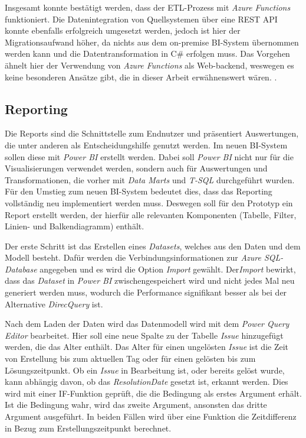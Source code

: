 Insgesamt konnte bestätigt werden, dass der ETL-Prozess mit \textit{Azure Functions} funktioniert. Die Datenintegration von Quellsystemen über eine REST API konnte ebenfalls erfolgreich umgesetzt werden, jedoch ist hier der Migrationsaufwand höher, da nichts aus dem on-premise BI-System übernommen werden kann und die Datentransformation in C\# erfolgen muss. Das Vorgehen ähnelt hier der Verwendung von \textit{Azure Functions} als Web-backend, weswegen es keine besonderen Ansätze gibt, die in dieser Arbeit erwähnenswert wären. 
\cite[vgl.][]{kurniawan_practical_2019, satapathi_hands-azure_2021, sreeram_azure_2020}.

\subsection{Reporting}
Die Reports sind die Schnittstelle zum Endnutzer und präsentiert Auswertungen, die unter anderen als Entscheidungshilfe genutzt werden. Im neuen BI-System sollen diese mit \textit{Power BI} erstellt werden. Dabei soll \textit{Power BI} nicht nur für die Visualisierungen verwendet werden, sondern auch für Auswertungen und Transformationen, die vorher mit \textit{Data Marts} und \textit{T-SQL} durchgeführt wurden. Für den Umstieg zum neuen BI-System bedeutet dies, dass das Reporting vollständig neu implementiert werden muss. Deswegen soll für den Prototyp ein Report erstellt werden, der hierfür alle relevanten Komponenten (Tabelle, Filter, Linien- und Balkendiagramm) enthält.

Der erste Schritt ist das Erstellen eines \textit{Datasets}, welches aus den Daten und dem Modell besteht. Dafür werden die Verbindungsinformationen zur \textit{Azure SQL-Database} angegeben und es wird die Option \textit{Import} gewählt. Der\textit{Import} bewirkt, dass das \textit{Dataset} in \textit{Power BI} zwischengespeichert wird und nicht jedes Mal neu generiert werden muss, wodurch die Performance signifikant besser als bei der Alternative \textit{DirecQuery} ist.

Nach dem Laden der Daten wird das Datenmodell wird mit dem \textit{Power Query Editor} bearbeitet. Hier soll eine neue Spalte zu der Tabelle \textit{Issue} hinzugefügt werden, die das Alter enthält. Das Alter für einen ungelösten \textit{Issue} ist die Zeit von Erstellung bis zum aktuellen Tag oder für einen gelösten bis zum Lösungszeitpunkt. Ob ein \textit{Issue} in Bearbeitung ist, oder bereits gelöst wurde, kann abhängig davon, ob das \textit{ResolutionDate} gesetzt ist, erkannt werden. Dies wird mit einer IF-Funktion geprüft, die die Bedingung als erstes Argument erhält. Ist die Bedingung wahr, wird das zweite Argument, ansonsten das dritte Argument ausgeführt. In beiden Fällen wird über eine Funktion die Zeitdifferenz in Bezug zum Erstellungszeitpunkt berechnet.

